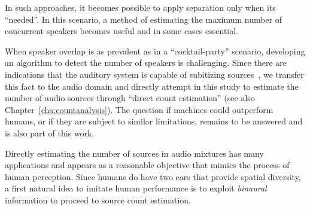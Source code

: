 In such approaches, it becomes possible to apply separation only when its ``needed''.
In this scenario, a method of estimating the maximum number of concurrent speakers becomes useful and in some cases essential.
\par
When speaker overlap is as prevalent as in a ``cocktail-party'' scenario, developing an algorithm to detect the number of speakers is challenging.
Since there are indications that the auditory system is capable of subitizing sources~\cite{hoopen79}, we transfer this fact to the audio domain and directly attempt in this study to estimate the number of audio sources through ``direct count estimation'' (see also Chapter~\ref{cha:countanalysis}).
The question if machines could outperform humans, or if they are subject to similar limitations, remains to be answered and is also part of this work.
\par
Directly estimating the number of sources in audio mixtures has many applications and appears as a reasonable objective that mimics the process of human perception.
Since humans do have two ears that provide spatial diversity, a first natural idea to imitate human performance is to exploit \textit{binaural} information to proceed to source count estimation.
